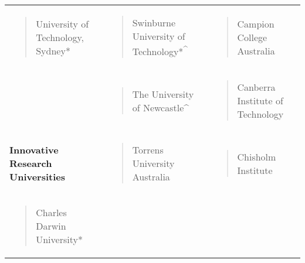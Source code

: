\documentclass[]{book}
\begin{document}
\begin{longtable}[]{@{}lll@{}}
\begin{minipage}[t]{0.32\columnwidth}\raggedright
\begin{quote}
University of Technology, Sydney*
\end{quote}\strut
\end{minipage} & \begin{minipage}[t]{0.32\columnwidth}\raggedright
\begin{quote}
Swinburne University of Technology*\textsuperscript{\^{}}
\end{quote}\strut
\end{minipage} & \begin{minipage}[t]{0.32\columnwidth}\raggedright
\begin{quote}
Campion College Australia
\end{quote}\strut
\end{minipage}\tabularnewline
\begin{minipage}[t]{0.32\columnwidth}\raggedright
\strut
\end{minipage} & \begin{minipage}[t]{0.32\columnwidth}\raggedright
\begin{quote}
The University of Newcastle\^{}
\end{quote}\strut
\end{minipage} & \begin{minipage}[t]{0.32\columnwidth}\raggedright
\begin{quote}
Canberra Institute of Technology
\end{quote}\strut
\end{minipage}\tabularnewline
\begin{minipage}[t]{0.32\columnwidth}\raggedright
\textbf{Innovative Research Universities }\strut
\end{minipage} & \begin{minipage}[t]{0.32\columnwidth}\raggedright
\begin{quote}
Torrens University Australia
\end{quote}\strut
\end{minipage} & \begin{minipage}[t]{0.32\columnwidth}\raggedright
\begin{quote}
Chisholm Institute
\end{quote}\strut
\end{minipage}\tabularnewline
\begin{minipage}[t]{0.32\columnwidth}\raggedright
\begin{quote}
Charles Darwin University*

\end{quote}
\end{minipage}
\end{longtable}
\end{document}
